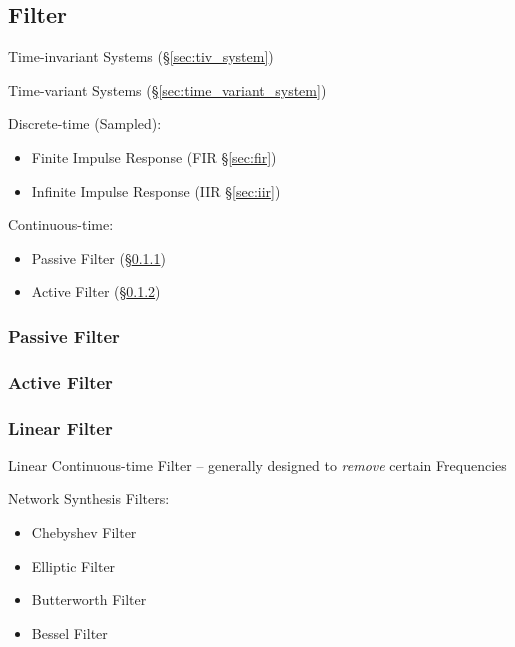 \subsection{Filter}\label{sec:signal_filter}

Time-invariant Systems (\S\ref{sec:tiv_system})

Time-variant Systems (\S\ref{sec:time_variant_system})

Discrete-time (Sampled):
\begin{itemize}
  \item Finite Impulse Response (FIR \S\ref{sec:fir})
  \item Infinite Impulse Response (IIR \S\ref{sec:iir})
\end{itemize}

Continuous-time:
\begin{itemize}
  \item Passive Filter (\S\ref{sec:passive_filter})
  \item Active Filter (\S\ref{sec:active_filter})
\end{itemize}



\subsubsection{Passive Filter}\label{sec:passive_filter}

\subsubsection{Active Filter}\label{sec:active_filter}

\subsubsection{Linear Filter}\label{sec:linear_filter}

Linear Continuous-time Filter -- generally designed to \emph{remove} certain
Frequencies

Network Synthesis Filters:
\begin{itemize}
  \item Chebyshev Filter
  \item Elliptic Filter
  \item Butterworth Filter
  \item Bessel Filter
\end{itemize}


